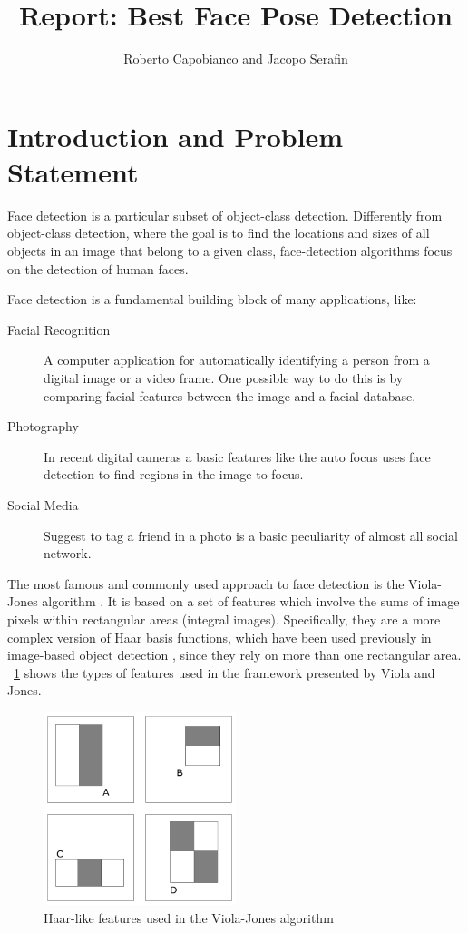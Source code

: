 \documentclass[10pt,a4paper]{report}
\author{Roberto Capobianco and Jacopo Serafin}
\title{Report: Best Face Pose Detection}
\begin{document}
\maketitle

\section*{Introduction and Problem Statement}
Face detection is a particular subset of object-class detection. Differently from object-class detection, where the goal is to find the locations and sizes of all objects in an image that belong to a given class, face-detection algorithms focus on the detection of human faces.

Face detection is a fundamental building block of many applications, like:
\begin{description}
  \item[Facial Recognition] A computer application for automatically identifying a person from a digital image or a video frame. One possible way to do this is by comparing facial features between the image and a facial database.
  \item[Photography] In recent digital cameras a basic features like the auto focus uses face detection to find regions in the image to focus.
  \item[Social Media] Suggest to tag a friend in a photo is a basic peculiarity of almost all social network.
\end{description}
The most famous and commonly used approach to face detection is the Viola-Jones algorithm \cite{viola2004robust}. It is based on a set of features which involve the sums of image pixels within rectangular areas (integral images). Specifically, they are a more complex version of Haar basis functions, which have been used previously in image-based object detection \cite{papageorgiou}, since they rely on more than one rectangular area. \figurename~\ref{fig:haar_features} shows the types of features used in the framework presented by Viola and Jones. 
\begin{figure}
\centering
\includegraphics[width=0.5\textwidth]{./haar_features.png}
\caption{Haar-like features used in the Viola-Jones algorithm}
\label{fig:haar_features}
\end{figure}
\end{document}
